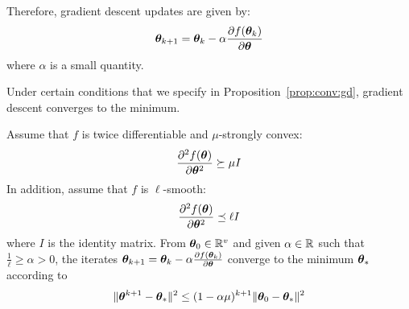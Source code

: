 Therefore, gradient descent updates are given by:
\begin{align}
  \thetab_{k+1} = \thetab_k -\alpha \partialfrac{\thetab}{f(\thetab_k)} \label{eq:update:gd}
\end{align}
where $\alpha$ is a small quantity.

Under certain conditions that we specify in Proposition~\ref{prop:conv:gd},
gradient descent converges to the minimum.

\begin{proposition}
  \label{prop:conv:gd}
  Assume that $f$ is twice differentiable and $\mu$-strongly convex:
  \begin{equation}
    \partialfrac{\thetab^2}{^2f(\thetab)} \succeq \mu I
  \end{equation}
  In addition, assume that $f$ is $\ell$-smooth:
  \begin{equation}
    \partialfrac{\thetab^2}{^2f(\thetab)} \preceq \ell I
  \end{equation}
  where $I$ is the identity matrix.
  From $\thetab_0 \in \RR^v$ and given $\alpha \in \RR$ such that $\frac1{\ell} \geq \alpha > 0$, the iterates
  $\thetab_{k+1} = \thetab_k -\alpha \partialfrac{\thetab}{f(\thetab_k)}$ converge to the
  minimum $\thetab_*$ according to
  \begin{equation}
    \| \thetab^{k+1} - \thetab_* \|^2 \leq (1 - \alpha \mu)^{k + 1} \| \thetab_0 - \thetab_* \|^2
  \end{equation}
\end{proposition}
